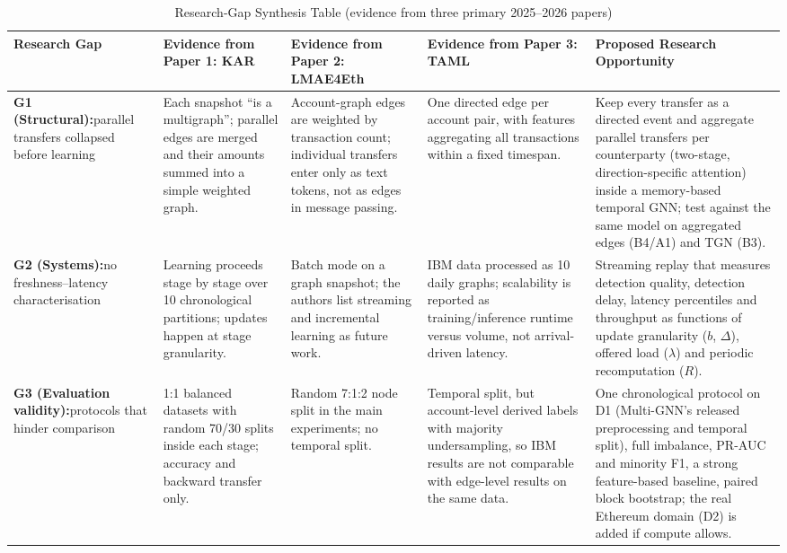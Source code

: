 \documentclass[11pt,a4paper]{article}
\begin{document}
\begin{table}[htbp]
\centering
\scriptsize
\caption{Research-Gap Synthesis Table (evidence from three primary 2025--2026 papers)}
\label{tab:gap_synthesis}
\begin{tabularx}{\textwidth}{L{2.0cm} L{2.75cm} L{2.75cm} L{2.75cm} X}
\toprule
\textbf{Research Gap} & \textbf{Evidence from Paper 1: KAR \cite{tian2025kar}} & \textbf{Evidence from Paper 2: LMAE4Eth \cite{jia2025lmae4eth}} & \textbf{Evidence from Paper 3: TAML \cite{rico2026taml}} & \textbf{Proposed Research Opportunity} \\
\midrule
\textbf{G1 (Structural):}\newline parallel transfers collapsed before learning & Each snapshot ``is a multigraph''; parallel edges are merged and their amounts summed into a simple weighted graph. & Account-graph edges are weighted by transaction count; individual transfers enter only as text tokens, not as edges in message passing. & One directed edge per account pair, with features aggregating all transactions within a fixed timespan. & Keep every transfer as a directed event and aggregate parallel transfers per counterparty (two-stage, direction-specific attention) inside a memory-based temporal GNN; test against the same model on aggregated edges (B4/A1) and TGN (B3). \\
\midrule
\textbf{G2 (Systems):}\newline no freshness--latency characterisation & Learning proceeds stage by stage over 10 chronological partitions; updates happen at stage granularity. & Batch mode on a graph snapshot; the authors list streaming and incremental learning as future work. & IBM data processed as 10 daily graphs; scalability is reported as training/inference runtime versus volume, not arrival-driven latency. & Streaming replay that measures detection quality, detection delay, latency percentiles and throughput as functions of update granularity ($b$, $\Delta$), offered load ($\lambda$) and periodic recomputation ($R$). \\
\midrule
\textbf{G3 (Evaluation validity):}\newline protocols that hinder comparison & 1:1 balanced datasets with random 70/30 splits inside each stage; accuracy and backward transfer only. & Random 7:1:2 node split in the main experiments; no temporal split. & Temporal split, but account-level derived labels with majority undersampling, so IBM results are not comparable with edge-level results on the same data. & One chronological protocol on D1 (Multi-GNN's released preprocessing and temporal split), full imbalance, PR-AUC and minority F1, a strong feature-based baseline, paired block bootstrap; the real Ethereum domain (D2) is added if compute allows. \\

\end{tabularx}
\end{table}
\end{document}
